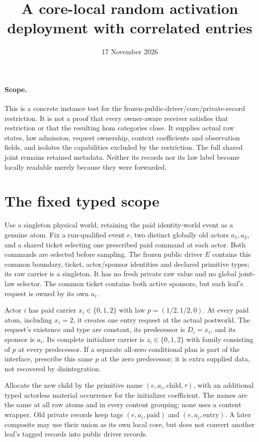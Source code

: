 \documentclass[11pt]{article}
\title{A core-local random activation deployment with correlated entries}
\date{17 November 2026}
\begin{document}
\maketitle
\paragraph{Scope.}
This is a concrete instance test for the frozen-public-driver/core/private-record restriction. It is not a proof that every owner-aware receiver satisfies that restriction or that the resulting hom categories close. It supplies actual raw states, law admission, request ownership, context coefficients and observation fields, and isolates the capabilities excluded by the restriction. The full shared joint remains retained metadata. Neither its records nor its law label become locally readable merely because they were forwarded.

\section{The fixed typed scope}
Use a singleton physical world, retaining the paid identity-world event as a genuine atom. Fix a run-qualified event $e$, two distinct globally old actors $a_1,a_2$, and a shared ticket selecting one prescribed paid command at each actor. Both commands are selected before sampling. The frozen public driver $E$ contains this common boundary, ticket, actor/sponsor identities and declared primitive types; its raw carrier is a singleton. It has no fresh private raw value and no global joint-law selector. The common ticket contains both active sponsors, but each leaf's request is owned by its own $a_i$.

Actor $i$ has paid carrier $x_i\in\{0,1,2\}$ with law $p=(1/2,1/2,0)$. At every paid atom, including $x_i=2$, it creates one entry request at the actual postworld. The request's existence and type are constant, its predecessor is $D_i=x_i$, and its sponsor is $a_i$. Its complete initializer carrier is $z_i\in\{0,1,2\}$ with family consisting of $p$ at every predecessor. If a separate all-zero conditional plan is part of the interface, prescribe this same $p$ at the zero predecessor; it is extra supplied data, not recovered by disintegration.

Allocate the new child by the primitive name $(e,a_i,\mathrm{child},\tau)$, with an additional typed actorless material occurrence for the initializer coefficient. The names are the same at all raw atoms and in every content grouping; none uses a content wrapper. Old private records keep tags $(e,a_i,\mathrm{paid})$ and $(e,a_i,\mathrm{entry})$. A later composite may use their union as its own local core, but does not convert another leaf's tagged records into public driver records.
\end{document}
